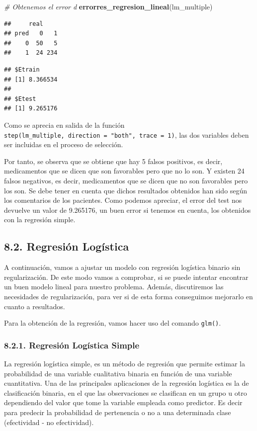 \documentclass[spanish,]{article}
\newenvironment{Shaded}{\begin{snugshade}}{\end{snugshade}}
\newcommand{\KeywordTok}[1]{\textcolor[rgb]{0.13,0.29,0.53}{\textbf{#1}}}
\newcommand{\CommentTok}[1]{\textcolor[rgb]{0.56,0.35,0.01}{\textit{#1}}}
\newcommand{\NormalTok}[1]{#1}
\begin{document}
\begin{Shaded}
\begin{Highlighting}[]
\CommentTok{# Obtenemos el error d}
\KeywordTok{errorres_regresion_lineal}\NormalTok{(lm_multiple)}
\end{Highlighting}
\end{Shaded}

\begin{verbatim}
##     real
## pred   0   1
##    0  50   5
##    1  24 234
\end{verbatim}

\begin{verbatim}
## $Etrain
## [1] 8.366534
## 
## $Etest
## [1] 9.265176
\end{verbatim}

Como se aprecia en salida de la función
\texttt{step(lm\_multiple,\ direction\ =\ "both",\ trace\ =\ 1)}, las
dos variables deben ser incluidas en el proceso de selección.

Por tanto, se observa que se obtiene que hay 5 falsos positivos, es
decir, medicamentos que se dicen que son favorables pero que no lo son.
Y existen 24 falsos negativos, es decir, medicamentos que se dicen que
no son favorables pero los son. Se debe tener en cuenta que dichos
resultados obtenidos han sido según los comentarios de los pacientes.
Como podemos apreciar, el error del test nos devuelve un valor de
9.265176, un buen error si tenemos en cuenta, los obtenidos con la
regresión simple.

\subsection{8.2. Regresión Logística}\label{regresion-logistica}

A continuación, vamos a ajustar un modelo con regresión logística
binario sin regularización. De este modo vamos a comprobar, si se puede
intentar encontrar un buen modelo lineal para nuestro problema. Además,
discutiremos las necesidades de regularización, para ver si de esta
forma conseguimos mejorarlo en cuanto a resultados.

Para la obtención de la regresión, vamos hacer uso del comando
\texttt{glm()}.

\subsubsection{8.2.1. Regresión Logística
Simple}\label{regresion-logistica-simple}

La regresión logística simple, es un método de regresión que permite
estimar la probabilidad de una variable cualitativa binaria en función
de una variable cuantitativa. Una de las principales aplicaciones de la
regresión logística es la de clasificación binaria, en el que las
observaciones se clasifican en un grupo u otro dependiendo del valor que
tome la variable empleada como predictor. Es decir para predecir la
probabilidad de pertenencia o no a una determinada clase (efectividad -
no efectividad).
\end{document}
